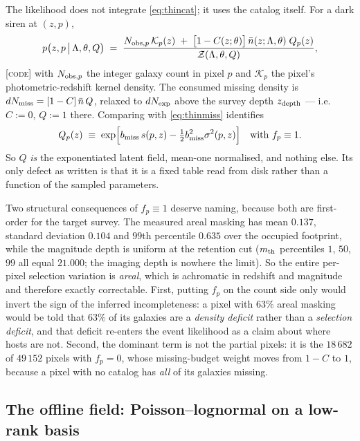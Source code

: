 \documentclass[11pt]{article}
\theoremstyle{definition}
\theoremstyle{remark}
\newcommand{\nbar}{\bar n}
\newcommand{\zdep}{z_{\rm depth}}
\begin{document}
The likelihood does not integrate \eqref{eq:thincat}; it uses the catalog itself.
For a dark siren at $(z,p)$,
\begin{equation}
  p\big(z,p\,\big|\,\Lambda,\theta,Q\big)
  \;=\;\frac{N_{{\rm obs},p}\,\mathcal K_p(z)\;+\;\big[1-C(z;\theta)\big]\,
  \nbar(z;\Lambda,\theta)\;Q_p(z)}{\mathcal Z(\Lambda,\theta,Q)},
  \label{eq:zprior}
\end{equation}
\textsc{[code]} with $N_{{\rm obs},p}$ the integer galaxy count in pixel $p$ and
$\mathcal K_p$ the pixel's photometric-redshift kernel density. The consumed
missing density is $dN_{\rm miss}=[1-C]\,\nbar\,Q$, relaxed to $dN_{\rm exp}$ above
the survey depth $\zdep$ --- i.e.\ $C:=0$, $Q:=1$ there. Comparing with
\eqref{eq:thinmiss} identifies
\begin{equation}
  Q_p(z)\;\equiv\;\exp\!\Big[b_{\rm miss}\,s(p,z)-\tfrac12 b_{\rm miss}^2\sigma^2(p,z)\Big]
  \quad\text{with } f_p\equiv1 .
  \label{eq:Qdef}
\end{equation}
So $Q$ \emph{is} the exponentiated latent field, mean-one normalised, and nothing
else. Its only defect as written is that it is a fixed table read from disk rather
than a function of the sampled parameters.

Two structural consequences of $f_p\equiv1$ deserve naming, because both are
first-order for the target survey. The measured areal masking has mean $0.137$,
standard deviation $0.104$ and $99$th percentile $0.635$ over the occupied
footprint, while the magnitude depth is uniform at the retention cut
($m_{\rm th}$ percentiles $1$, $50$, $99$ all equal $21.000$; the imaging depth is
nowhere the limit). So the entire per-pixel selection variation is \emph{areal},
which is achromatic in redshift and magnitude and therefore exactly correctable.
First, putting $f_p$ on the count side only would invert the sign of the inferred
incompleteness: a pixel with $63\%$ areal masking would be told that $63\%$ of its
galaxies are a \emph{density deficit} rather than a \emph{selection deficit}, and
that deficit re-enters the event likelihood as a claim about where hosts are not.
Second, the dominant term is not the partial pixels: it is the $18\,682$ of
$49\,152$ pixels with $f_p=0$, whose missing-budget weight moves from $1-C$ to $1$,
because a pixel with no catalog has \emph{all} of its galaxies missing.

\subsection{The offline field: Poisson--lognormal on a low-rank basis}
\end{document}
